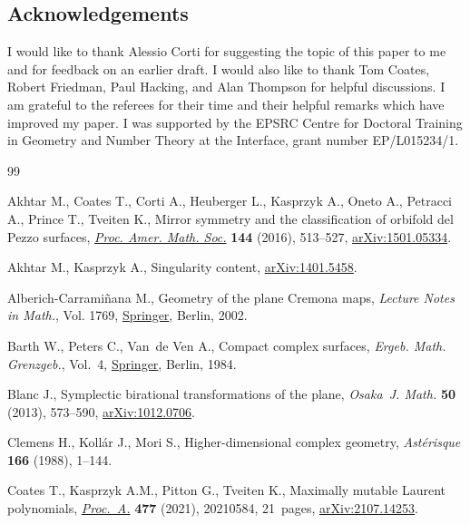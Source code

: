\documentclass[pdftex]{sigma}
\numberwithin{equation}{section}
\begin{document}
\subsection*{Acknowledgements}
I would like to thank Alessio Corti for suggesting the topic of this paper to me and for feedback on an earlier draft.
I would also like to thank Tom Coates, Robert Friedman, Paul Hacking, and Alan Thompson for helpful discussions.
I am grateful to the referees for their time and their helpful remarks which have improved my paper.
I was supported by the EPSRC Centre for Doctoral
Training in Geometry and Number Theory at the Interface, grant number EP/L015234/1.


\begin{thebibliography}{99}
\footnotesize\itemsep=0pt

Akhtar M., Coates T., Corti A., Heuberger L., Kasprzyk A., Oneto A., Petracci
 A., Prince T., Tveiten K., Mirror symmetry and the classification of orbifold
 del {P}ezzo surfaces, \href{https://doi.org/10.1090/proc/12876}{\textit{Proc. Amer. Math. Soc.}} \textbf{144} (2016),
 513--527, \href{https://arxiv.org/abs/1501.05334}{arXiv:1501.05334}.

Akhtar M., Kasprzyk A., Singularity content, \href{https://arxiv.org/abs/1401.5458}{arXiv:1401.5458}.

Alberich-Carrami\~nana M., Geometry of the plane {C}remona maps,
 \textit{Lecture Notes in Math.}, Vol. 1769, \href{https://doi.org/10.1007/b82933}{Springer}, Berlin, 2002.

Barth W., Peters C., Van~de Ven A., Compact complex surfaces, \textit{Ergeb.
 Math. Grenzgeb.}, Vol.~4, \href{https://doi.org/10.1007/978-3-642-96754-2}{Springer}, Berlin, 1984.

Blanc J., Symplectic birational transformations of the plane, \textit{Osaka~J.
 Math.} \textbf{50} (2013), 573--590, \href{https://arxiv.org/abs/1012.0706}{arXiv:1012.0706}.

Clemens H., Koll\'{a}r J., Mori S., Higher-dimensional complex geometry,
 \textit{Ast\'erisque} \textbf{166} (1988), 1--144.

Coates T., Kasprzyk A.M., Pitton G., Tveiten K., Maximally mutable {L}aurent
 polynomials, \href{https://doi.org/10.1098/rspa.2021.0584}{\textit{Proc.~A.}} \textbf{477} (2021), 20210584, 21~pages,
 \href{https://arxiv.org/abs/2107.14253}{arXiv:2107.14253}.


\end{thebibliography}
\end{document}
